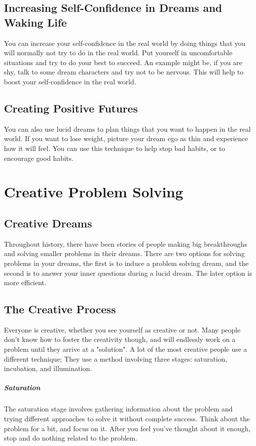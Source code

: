 \documentclass{report}
\begin{document}
\section{Increasing Self-Confidence in Dreams and Waking Life}
You can increase your self-confidence in the real world by doing things that you will normally not try to do in the real world. Put yourself in uncomfortable situations and try to do your best to succeed. An example might be, if you are shy, talk to some dream characters and try not to be nervous. This will help to boost your self-confidence in the real world.

\section{Creating Positive Futures}
You can also use lucid dreams to plan things that you want to happen in the real world. If you want to lose weight, picture your dream ego as thin and experience how it will feel. You can use this technique to help stop bad habits, or to encourage good habits. 


\chapter{Creative Problem Solving}

\section{Creative Dreams}
Throughout history, there have been stories of people making big breakthroughs and solving smaller problems in their dreams. There are two options for solving problems in your dreams, the first is to induce a problem solving dream, and the second is to answer your inner questions during a lucid dream. The later option is more efficient.

\section{The Creative Process}
Everyone is creative, whether you see yourself as creative or not. Many people don't know how to foster the creativity though, and will endlessly work on a problem until they arrive at a "solution". A lot of the most creative people use a different technique; They use a method involving three stages: saturation, incubation, and illumination.

\paragraph{Saturation} The saturation stage involves gathering information about the problem and trying different approaches to solve it without complete success. Think about the problem for a bit, and focus on it. After you feel you've thought about it enough, stop and do nothing related to the problem.
\end{document}

